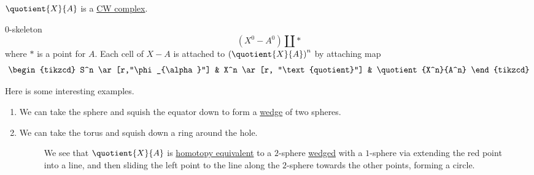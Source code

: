 \begin{remark}
	\(\quotient{X}{A} \) is a \hyperref[def:CW-Complex]{CW complex}.
\end{remark}
\(0\)-skeleton
\[
	(X^0 - A^0)\coprod \ast
\]
where \(\ast\) is a point for \(A\). Each cell of \(X-A\) is attached to \(\left(\quotient{X}{A} \right)^n\)
by attaching map
\[
	\begin{tikzcd}
		S^n \ar[r,"\phi_{\alpha}"] & X^n \ar[r, "\text{quotient}"] & \quotient{X^n}{A^n}
	\end{tikzcd}
\]

\begin{eg}
	Here is some interesting examples.
	\begin{enumerate}
		\item We can take the sphere and squish the equator down to form a \hyperref[CW-complex-wedge-sum]{wedge} of two spheres.
		      \begin{figure}[H]
			      \centering
			      \label{fig:eg:quotient-cw-complex-sphere}
		      \end{figure}
		\item We can take the torus and squish down a ring around the hole.
		      \begin{figure}[H]
			      \centering
			      \caption{We see that \(\quotient{X}{A}\) is \hyperref[def:homotopy-equivalence]{homotopy equivalent}
				      to a \(2\)-sphere \hyperref[CW-complex-wedge-sum]{wedged} with a \(1\)-sphere via extending the red point into a line, and then
				      sliding the left point to the line along the \(2\)-sphere towards the other points, forming a circle.}
			      \label{fig:eg:quotient-cw-complex-torus}
		      \end{figure}
	\end{enumerate}
\end{eg}
